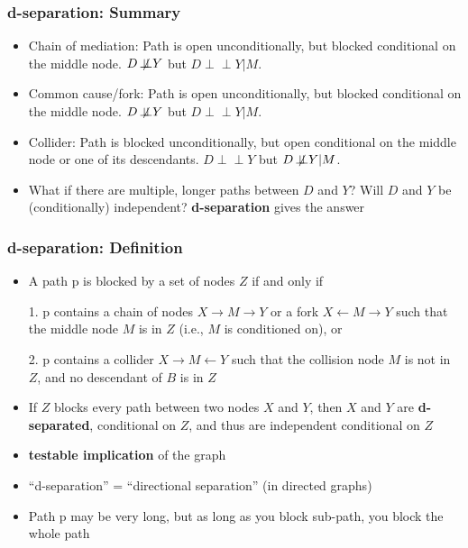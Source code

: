 \documentclass{beamer}
\newcommand{\indep}{\mbox{$\perp\!\!\!\perp$}}
\newcommand{\notindep}{\mbox{ $\not\!\perp\!\!\!\perp$}}
\begin{document}
\begin{frame}[t]
\frametitle{d-separation: Summary}

\begin{itemize}
	
	\item<1-> Chain of mediation: Path is open unconditionally, but blocked conditional on the middle node. $D \notindep Y$ but $D \indep Y|M$. 
	\item<2-> Common cause/fork: Path is open unconditionally, but blocked conditional on the middle node. $D \notindep Y$ but $D \indep Y|M$. 
	\item<3-> Collider: Path is blocked unconditionally, but open conditional on the middle node or one of its descendants. $D \indep Y$ but $D \notindep Y|M$. 
	\item<4-> What if there are multiple, longer paths between $D$ and $Y$? Will $D$ and $Y$ be (conditionally) independent? \textbf{d-separation} gives the answer
\end{itemize}
\end{frame}

\begin{frame}[t]
\frametitle{d-separation: Definition}

\begin{itemize}

\item<1-> A path p is blocked by a set of nodes $Z$ if and only if

1. p contains a chain of nodes $X \rightarrow M \rightarrow Y$ or a fork $X \leftarrow M \rightarrow Y$ such that the middle node $M$ is in $Z$ (i.e., $M$ is conditioned on), or

2. p contains a collider $X \rightarrow M \leftarrow Y$ such that the collision node $M$ is not in $Z$, and no descendant of $B$ is in $Z$
\item<2-> If $Z$ blocks every path between two nodes $X$ and $Y$, then $X$ and $Y$ are \textbf{d-separated}, conditional	on $Z$, and thus are independent conditional on $Z$
\item<3-> \textbf{testable implication} of the graph
\item<4-> ``d-separation'' = ``directional separation'' (in directed graphs)
\item<5-> Path p may be very long, but as long as you block sub-path, you block the whole path
\end{itemize}
\end{frame}
\end{document}
